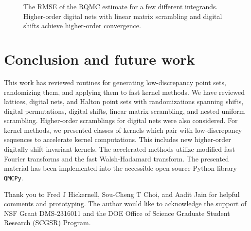 \documentclass[acmsmall]{acmart}
\begin{document}

\begin{listing}[H]
    \inputminted{python}{snippets/genz_ex_1.txt}
    \caption{Randomized QMC approximation and error estimation for a fixed number of points.}
    \label{code:genz_ex_1}
\end{listing}

\begin{figure}%
    \centering
    \caption{The RMSE of the RQMC estimate for a few different integrands. Higher-order digital nets with linear matrix scrambling and digital shifts achieve higher-order convergence.}
    \Description[]{}
    \label{fig:convergence}
\end{figure}

\section{Conclusion and future work} \label{sec:conclusions_future_work}

This work has reviewed routines for generating low-discrepancy point sets, randomizing them, and applying them to fast kernel methods. We have reviewed lattices, digital nets, and Halton point sets with randomizations spanning shifts, digital permutations, digital shifts, linear matrix scrambling, and nested uniform scrambling. Higher-order scramblings for digital nets were also considered. For kernel methods, we presented classes of kernels which pair with low-discrepancy sequences to accelerate kernel computations. This includes new higher-order digitally-shift-invariant kernels. The accelerated methods utilize modified fast Fourier transforms and the fast Walsh-Hadamard transform. The presented material has been implemented into the accessible open-source Python library \texttt{QMCPy}.  

\begin{acks}
    Thank you to Fred J Hickernell, Sou-Cheng T Choi, and Aadit Jain for helpful comments and prototyping. The author would like to acknowledge the support of NSF Grant DMS-2316011 and the DOE Office of Science Graduate Student Research (SCGSR) Program. 
\end{acks}

%



\end{document}
